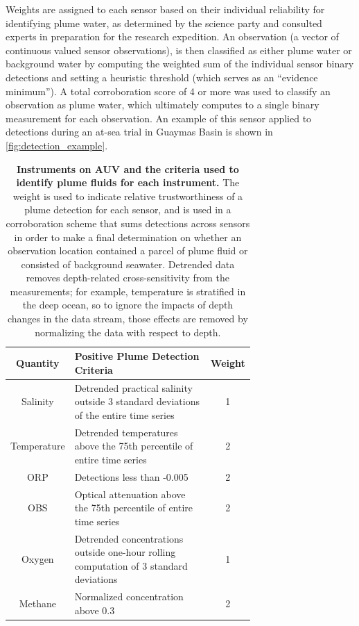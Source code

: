 Weights are assigned to each sensor based on their individual reliability for identifying plume water, as determined by the science party and consulted experts in preparation for the research expedition. An observation (a vector of continuous valued sensor observations), is then classified as either plume water or background water by computing the weighted sum of the individual sensor binary detections and setting a heuristic threshold (which serves as an ``evidence minimum''). A total corroboration score of 4 or more was used to classify an observation as plume water, which ultimately computes to a single binary measurement for each observation. An example of this sensor applied to \Sentry detections during an at-sea trial in Guaymas Basin is shown in \cref{fig:detection_example}.

\begin{table}[h!]
    \centering
    \begin{tabular}{c|p{0.7\linewidth}|c}
        Quantity & Positive Plume Detection Criteria & Weight  \\
        \hline
        Salinity & Detrended practical salinity outside 3 standard deviations of the entire time series & 1 \\
        \hline
        Temperature & Detrended temperatures above the 75th percentile of entire time series & 2 \\
        \hline
        ORP & Detections less than -0.005 & 2 \\
        \hline
        OBS & Optical attenuation above the 75th percentile of entire time series & 2 \\
        \hline
        Oxygen & Detrended concentrations outside one-hour rolling computation of 3 standard deviations & 1 \\
        \hline
        Methane & Normalized concentration above 0.3 & 2
    \end{tabular}
    \caption[Instruments on AUV \Sentry and the criteria used to identify plume fluids for each instrument.]{\textbf{Instruments on AUV \Sentry and the criteria used to identify plume fluids for each instrument.} The weight is used to indicate relative trustworthiness of a plume detection for each sensor, and is used in a corroboration scheme that sums detections across sensors in order to make a final determination on whether an observation location contained a parcel of plume fluid or consisted of background seawater. Detrended data removes depth-related cross-sensitivity from the measurements; for example, temperature is stratified in the deep ocean, so to ignore the impacts of depth changes in the data stream, those effects are removed by normalizing the data with respect to depth.}
    \label{tab:sentry_instruments}
\end{table}

